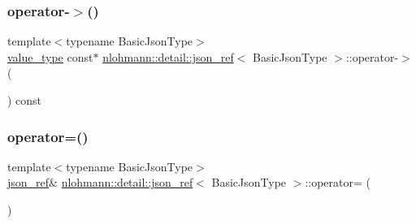 \subsubsection{\texorpdfstring{operator-\/$>$()}{operator->()}}
{\footnotesize\ttfamily template$<$typename Basic\+Json\+Type$>$ \\
\mbox{\hyperlink{classnlohmann_1_1detail_1_1json__ref_a78d76cf288141049568c0d670ed670ef}{value\+\_\+type}} const$\ast$ \mbox{\hyperlink{classnlohmann_1_1detail_1_1json__ref}{nlohmann\+::detail\+::json\+\_\+ref}}$<$ Basic\+Json\+Type $>$\+::operator-\/$>$ (\begin{DoxyParamCaption}{ }\end{DoxyParamCaption}) const\hspace{0.3cm}{\ttfamily [inline]}}

\mbox{\label{classnlohmann_1_1detail_1_1json__ref_a98956ba676b1ae16b62346f9c4fb752e}} 
\subsubsection{\texorpdfstring{operator=()}{operator=()}\hspace{0.1cm}{\footnotesize\ttfamily [1/2]}}
{\footnotesize\ttfamily template$<$typename Basic\+Json\+Type$>$ \\
\mbox{\hyperlink{classnlohmann_1_1detail_1_1json__ref}{json\+\_\+ref}}\& \mbox{\hyperlink{classnlohmann_1_1detail_1_1json__ref}{nlohmann\+::detail\+::json\+\_\+ref}}$<$ Basic\+Json\+Type $>$\+::operator= (\begin{DoxyParamCaption}\item[{const \mbox{\hyperlink{classnlohmann_1_1detail_1_1json__ref}{json\+\_\+ref}}$<$ Basic\+Json\+Type $>$ \&}]{ }\end{DoxyParamCaption})\hspace{0.3cm}{\ttfamily [delete]}}

\mbox{\label{classnlohmann_1_1detail_1_1json__ref_a9a73363d9be6b300ddd30745786c50a6}} 
